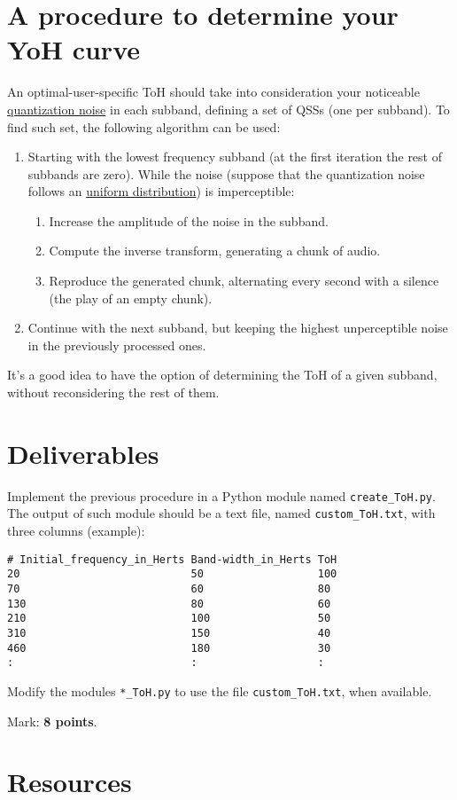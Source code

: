 \section{A procedure to determine your YoH curve}

An optimal-user-specific ToH
should take into consideration your noticeable
\href{https://en.wikipedia.org/wiki/Quantization_(signal_processing)}{quantization
  noise} in each subband, defining a set of QSSs (one per subband). To
find such set, the following algorithm can be used:

\begin{enumerate}
\item %
  Starting with the lowest frequency subband (at the first
  iteration the rest of subbands are zero). While the noise
  (suppose that the quantization noise follows an
  \href{https://en.wikipedia.org/wiki/Continuous_uniform_distribution}{uniform
    distribution}) is imperceptible:
  \begin{enumerate}
  \item Increase the amplitude of the noise in the subband.
  \item Compute the inverse transform, generating a chunk of audio.
  \item Reproduce the generated chunk, alternating every second with
    a silence (the play of an empty chunk).
  \end{enumerate}
\item Continue with the next subband, but keeping the
  highest unperceptible noise in the previously processed
  ones.
\end{enumerate}

It's a good idea to have the option of determining the ToH of a given
subband, without reconsidering the rest of them.

\section{Deliverables}

Implement the previous procedure in a Python module named
\verb|create_ToH.py|. The output of such module should be a text file,
named \verb|custom_ToH.txt|, with three columns (example):
\begin{verbatim}
# Initial_frequency_in_Herts Band-width_in_Herts ToH
20                           50                  100
70                           60                  80
130                          80                  60
210                          100                 50
310                          150                 40
460                          180                 30
:                            :                   :
\end{verbatim}

Modify the modules \verb|*_ToH.py| to use the file
\verb|custom_ToH.txt|, when available.

Mark: \textbf{8 points}.

\section{Resources}



